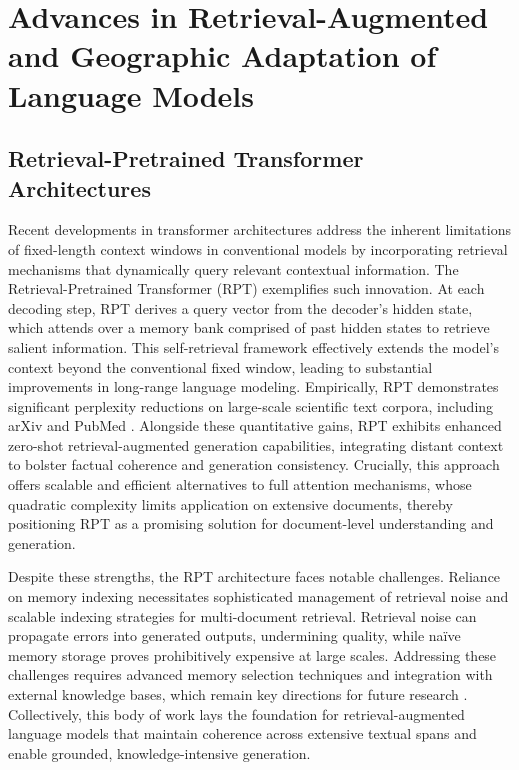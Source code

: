 \documentclass[sigconf]{acmart}
\begin{document}
\section{Advances in Retrieval-Augmented and Geographic Adaptation of Language Models}

\subsection{Retrieval-Pretrained Transformer Architectures}

Recent developments in transformer architectures address the inherent limitations of fixed-length context windows in conventional models by incorporating retrieval mechanisms that dynamically query relevant contextual information. The Retrieval-Pretrained Transformer (RPT) exemplifies such innovation. At each decoding step, RPT derives a query vector from the decoder’s hidden state, which attends over a memory bank comprised of past hidden states to retrieve salient information. This self-retrieval framework effectively extends the model’s context beyond the conventional fixed window, leading to substantial improvements in long-range language modeling. Empirically, RPT demonstrates significant perplexity reductions on large-scale scientific text corpora, including arXiv and PubMed \cite{ref29}. Alongside these quantitative gains, RPT exhibits enhanced zero-shot retrieval-augmented generation capabilities, integrating distant context to bolster factual coherence and generation consistency. Crucially, this approach offers scalable and efficient alternatives to full attention mechanisms, whose quadratic complexity limits application on extensive documents, thereby positioning RPT as a promising solution for document-level understanding and generation.

Despite these strengths, the RPT architecture faces notable challenges. Reliance on memory indexing necessitates sophisticated management of retrieval noise and scalable indexing strategies for multi-document retrieval. Retrieval noise can propagate errors into generated outputs, undermining quality, while naïve memory storage proves prohibitively expensive at large scales. Addressing these challenges requires advanced memory selection techniques and integration with external knowledge bases, which remain key directions for future research \cite{ref29}. Collectively, this body of work lays the foundation for retrieval-augmented language models that maintain coherence across extensive textual spans and enable grounded, knowledge-intensive generation.
\end{document}

